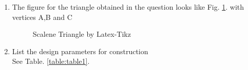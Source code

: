 \renewcommand{\theequation}{\theenumi}
\begin{enumerate}[label=\thesection.\arabic*.,ref=\thesection.\theenumi]
\item The figure for the triangle obtained in the question looks like Fig. \ref{fig:tri_right_angle}.
with vertices A,B and C


\begin{figure}[!ht]
\centering
\resizebox{\columnwidth}{!}{}
\caption{Scalene Triangle by Latex-Tikz}
\label{fig:tri_right_angle}	
\end{figure}
%
%
%
\item List the design parameters for construction
\label{const:table1}
\\
\solution See Table. \ref{table:table1}. 
%
\begin{table}[ht!]
\centering

\caption{To construct $\triangle ABC$}
\label{table:table1}	
\end{table}


\end{enumerate}
